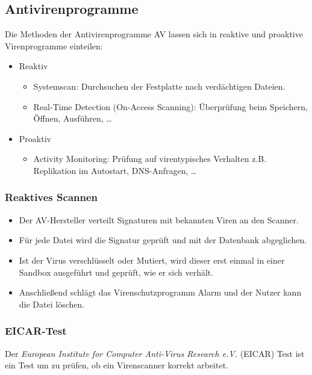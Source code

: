         \subsection{Antivirenprogramme}
            Die Methoden der Antivirenprogramme AV lassen sich in reaktive und proaktive Virenprogramme einteilen:
            \begin{itemize}
                \item Reaktiv
	                \begin{itemize}
	                	\item Systemscan: Durchsuchen der Festplatte nach verdächtigen Dateien.
	                	\item Real-Time Detection (On-Access Scanning): Überprüfung beim Speichern, Öffnen, Ausführen, \dots
	                \end{itemize}
                \item Proaktiv
	                \begin{itemize}
	                	\item Activity Monitoring: Prüfung auf virentypisches Verhalten z.B. Replikation im Autostart, DNS-Anfragen, \dots
	                \end{itemize}
            \end{itemize}

            \subsubsection{Reaktives Scannen}
                \begin{itemize}
                	\item Der AV-Hersteller verteilt Signaturen mit bekannten Viren an den Scanner.
                	\item Für jede Datei wird die Signatur geprüft und mit der Datenbank abgeglichen.
                	\item Ist der Virus verschlüsselt oder Mutiert, wird dieser erst einmal in einer Sandbox ausgeführt und geprüft, wie er sich verhält.
                	\item Anschließend schlägt das Virenschutzprogramm Alarm und der Nutzer kann die Datei löschen.
                \end{itemize}

            \subsubsection{EICAR-Test}
                Der \textit{European Institute for Computer Anti-Virus Research e.V.} (EICAR) Test ist ein Test um zu prüfen, ob ein Virenscanner korrekt arbeitet.
                
